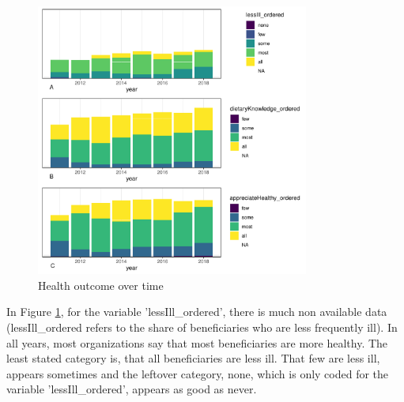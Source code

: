 \documentclass[12pt, a4paper, titlepage]{article}\usepackage[]{graphicx}\usepackage[]{color}
\newenvironment{knitrout}{}{} %
\begin{document}
\begin{figure}
  \caption{Health outcome over time}
  \label{HealthTimeplots}
\begin{knitrout}
\color{fgcolor}

{\centering \includegraphics[width=0.8\textwidth]{figure/HealthTimePlots-1} 

}



\end{knitrout}
\end{figure}

In Figure \ref{HealthTimeplots}, for the variable 'lessIll\_ordered', there is much non available data (lessIll\_ordered refers to the share of beneficiaries who are less frequently ill). In all years, most organizations say that most beneficiaries are more healthy. The least stated category is, that all beneficiaries are less ill. That few are less ill, appears sometimes and the leftover category, none, which is only coded for the variable 'lessIll\_ordered', appears as good as never.
\end{document}

